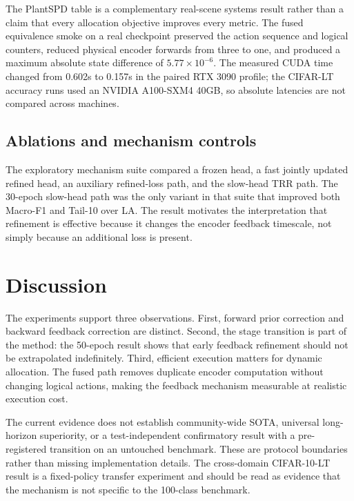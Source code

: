 \documentclass[10pt,letterpaper]{article}
\begin{document}
The PlantSPD table is a complementary real-scene systems result rather than a claim that every allocation objective improves every metric. The fused equivalence smoke on a real checkpoint preserved the action sequence and logical counters, reduced physical encoder forwards from three to one, and produced a maximum absolute state difference of $5.77\times 10^{-6}$. The measured CUDA time changed from 0.602s to 0.157s in the paired RTX 3090 profile; the CIFAR-LT accuracy runs used an NVIDIA A100-SXM4 40GB, so absolute latencies are not compared across machines.

\subsection{Ablations and mechanism controls}
The exploratory mechanism suite compared a frozen head, a fast jointly updated refined head, an auxiliary refined-loss path, and the slow-head TRR path. The 30-epoch slow-head path was the only variant in that suite that improved both Macro-F1 and Tail-10 over LA. The result motivates the interpretation that refinement is effective because it changes the encoder feedback timescale, not simply because an additional loss is present.

\section{Discussion}
The experiments support three observations. First, forward prior correction and backward feedback correction are distinct. Second, the stage transition is part of the method: the 50-epoch result shows that early feedback refinement should not be extrapolated indefinitely. Third, efficient execution matters for dynamic allocation. The fused path removes duplicate encoder computation without changing logical actions, making the feedback mechanism measurable at realistic execution cost.

The current evidence does not establish community-wide SOTA, universal long-horizon superiority, or a test-independent confirmatory result with a pre-registered transition on an untouched benchmark. These are protocol boundaries rather than missing implementation details. The cross-domain CIFAR-10-LT result is a fixed-policy transfer experiment and should be read as evidence that the mechanism is not specific to the 100-class benchmark.
\end{document}
